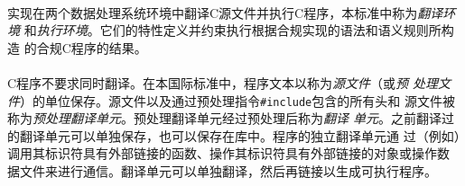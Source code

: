 
\paragraph{}
实现在两个数据处理系统环境中翻译C源文件并执行C程序，本标准中称为\textit{翻译环境
}和\textit{执行环境}。它们的特性定义并约束执行根据合规实现的语法和语义规则所构造
的合规C程序的结果。




\paragraph{}
C程序不要求同时翻译。在本国际标准中，程序文本以称为\textit{源文件}（或\textit{预
处理文件}）的单位保存。源文件以及通过预处理指令\texttt{\#include}包含的所有头和
源文件被称为\textit{预处理翻译单元}。预处理翻译单元经过预处理后称为\textit{翻译
单元}。之前翻译过的翻译单元可以单独保存，也可以保存在库中。程序的独立翻译单元通
过（例如）调用其标识符具有外部链接的函数、操作其标识符具有外部链接的对象或操作数
据文件来进行通信。翻译单元可以单独翻译，然后再链接以生成可执行程序。


